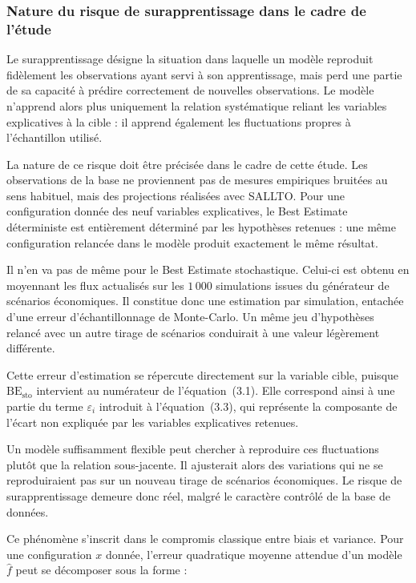 \subsubsection{Nature du risque de surapprentissage dans le cadre de l'étude}

Le surapprentissage désigne la situation dans laquelle un modèle reproduit fidèlement les observations ayant servi à son apprentissage, mais perd une partie de sa capacité à prédire correctement de nouvelles observations. Le modèle n'apprend alors plus uniquement la relation systématique reliant les variables explicatives à la cible : il apprend également les fluctuations propres à l'échantillon utilisé.

La nature de ce risque doit être précisée dans le cadre de cette étude. Les observations de la base ne proviennent pas de mesures empiriques bruitées au sens habituel, mais des projections réalisées avec SALLTO. Pour une configuration donnée des neuf variables explicatives, le Best Estimate déterministe est entièrement déterminé par les hypothèses retenues : une même configuration relancée dans le modèle produit exactement le même résultat.

Il n'en va pas de même pour le Best Estimate stochastique. Celui-ci est obtenu en moyennant les flux actualisés sur les $1\,000$ simulations issues du générateur de scénarios économiques. Il constitue donc une estimation par simulation, entachée d'une erreur d'échantillonnage de Monte-Carlo. Un même jeu d'hypothèses relancé avec un autre tirage de scénarios conduirait à une valeur légèrement différente.

Cette erreur d'estimation se répercute directement sur la variable cible, puisque $\text{BE}_{\text{sto}}$ intervient au numérateur de l'équation~(3.1). Elle correspond ainsi à une partie du terme $\varepsilon_i$ introduit à l'équation~(3.3), qui représente la composante de l'écart non expliquée par les variables explicatives retenues.

Un modèle suffisamment flexible peut chercher à reproduire ces fluctuations plutôt que la relation sous-jacente. Il ajusterait alors des variations qui ne se reproduiraient pas sur un nouveau tirage de scénarios économiques. Le risque de surapprentissage demeure donc réel, malgré le caractère contrôlé de la base de données.

Ce phénomène s'inscrit dans le compromis classique entre biais et variance. Pour une configuration $x$ donnée, l'erreur quadratique moyenne attendue d'un modèle $\hat{f}$ peut se décomposer sous la forme :

